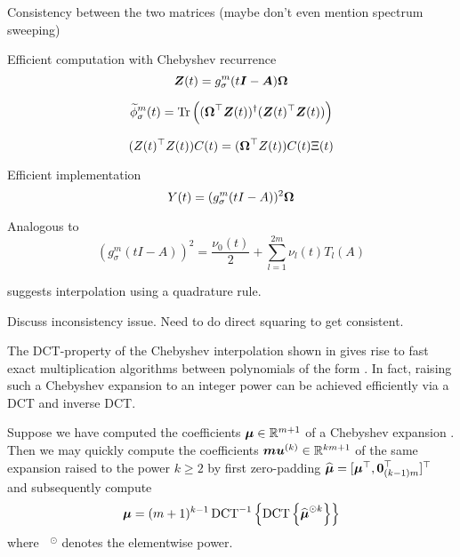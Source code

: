 Consistency between the two matrices (maybe don't even mention spectrum sweeping)

Efficient computation with Chebyshev recurrence
\begin{equation}
    \boldsymbol{Z}(t) = g_{\sigma}^m(t\boldsymbol{I} - \boldsymbol{A}) \boldsymbol{\Omega}
    \label{equ:3-nystrom-SS-Z}
\end{equation}

\begin{equation}
    \widetilde{\phi}_{\sigma}^m(t)
        = \operatorname{Tr}\left((\boldsymbol{\Omega}^{\top} \boldsymbol{Z}(t))^{\dagger} (\boldsymbol{Z}(t)^{\top} \boldsymbol{Z}(t))\right)
    \label{equ:3-nystrom-SS-spectral-density}
\end{equation}

\begin{equation}
    (Z(t)^{\top} Z(t)) C(t) = (\boldsymbol{\Omega}^{\top} Z(t)) C(t) \Xi(t)
    \label{equ:3-nystrom-SS-generalized-eigenproblem}
\end{equation}

Efficient implementation
\begin{equation}
    Y(t) = (g_{\sigma}^m(tI - A))^2 \boldsymbol{\Omega}
    \label{equ:3-nystrom-SS-Y}
\end{equation}

Analogous to 
\begin{equation}
    (g_{\sigma}^m(tI - A))^2 = \frac{\nu_0(t)}{2} + \sum_{l=1}^{2m} \nu_l(t) T_l(A)
    \label{equ:3-nystrom-ESS-chebyshev-expansion}
\end{equation}

\cite{lin2017randomized} suggests interpolation using a quadrature rule.

Discuss inconsistency issue. Need to do direct squaring to get consistent.

The \gls{DCT}-property of the Chebyshev interpolation shown in 
gives rise to fast exact multiplication algorithms between polynomials
of the form  \cite[Proposition~3.1]{baszenski1997cosine}.
In fact, raising such a Chebyshev expansion to an integer power can be achieved
efficiently via a \gls{DCT} and inverse \gls{DCT}.

Suppose we have computed the coefficients $\boldsymbol{\mu} \in \mathbb{R}^{m+1}$
of a Chebyshev expansion .
Then we may quickly compute the coefficients $\boldsymbol{mu}^{(k)} \in \mathbb{R}^{km+1}$
of the same expansion raised to the power $k \geq 2$ by first zero-padding
$\widehat{\boldsymbol{\mu}} = [\boldsymbol{\mu}^{\top}, \boldsymbol{0}_{(k-1)m}^{\top}]^{\top}$
and subsequently compute
\begin{equation}
    \boldsymbol{\mu} = (m+1)^{k - 1} \operatorname{DCT}^{-1}\left\{ \operatorname{DCT}\left\{\widehat{\boldsymbol{\mu}}^{\odot k}\right\} \right\}
    \label{equ:3-nystrom-chebyshev-square-coefficients}
\end{equation}
where $\phantom{x}^\odot$ denotes the elementwise power.

